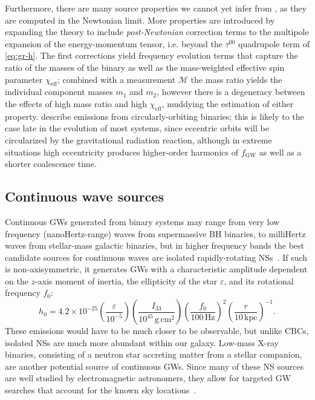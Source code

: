 Furthermore, there are many source properties we cannot yet infer from , as they are computed in the Newtonian limit.
More properties are introduced by expanding the theory to include \textit{post-Newtonian} correction terms to the multipole expansion of the energy-momentum tensor, i.e. beyond the $\tau^{00}$ quadrupole term of \cref{eq:gr-h}.
The first corrections yield frequency evolution terms that capture the ratio of the masses of the binary as well as the mass-weighted effective spin parameter $\chi_{\mathrm{eff}}$; combined with a measurement $\mathcal{M}$ the mass ratio yields the individual component masses $m_1$ and $m_2$, however there is a degeneracy between the effects of high mass ratio and high $\chi_{\mathrm{eff}}$, muddying the estimation of either property.
 describe emissions from circularly-orbiting binaries; this is likely to the case late in the evolution of most systems, since eccentric orbits will be circularized by the gravitational radiation reaction, although in extreme situations high eccentricity produces higher-order harmonics of $f_{\textrm{GW}}$ as well as a shorter coalescence time.


\subsection{Continuous wave sources}

Continuous \acp{GW} generated from binary systems may range from very low frequency (nanoHertz-range) waves from supermassive \ac{BH} binaries, to milliHertz waves from stellar-mass galactic binaries, but in higher frequency bands the best candidate sources for continuous waves are isolated rapidly-rotating \acp{NS}~\citep{Riles_2017}.
If such  is non-axisymmetric, it generates \acp{GW} with a characteristic amplitude dependent on the $z$-axis moment of inertia, the ellipticity of the star $\varepsilon$,  and its rotational frequency $f_0$:
\begin{equation}
	h_0 = 4.2 \times 10^{-25}
		\left( \frac{\varepsilon}{10^{-5}} \right)
		\left( \frac{I_{33}}{10^{45}\,\mathrm{g\,cm^2}} \right)
		\left( \frac{f_0}{100\,\mathrm{Hz}} \right)^2
		\left( \frac{r}{10\,\mathrm{kpc}} \right)^{-1}.
\end{equation}
These emissions would have to be much closer to be observable, but unlike \acp{CBC}, isolated \acp{NS} are much more abundant within our galaxy.
Low-mass X-ray binaries, consisting of a neutron star accreting matter from a stellar companion, are another potential source of continuous \acp{GW}.
Since many of these \ac{NS} sources are well studied by electromagnetic astronomers, they allow for targeted GW searches that account for the known sky locations~\citep{cw_o3}.


